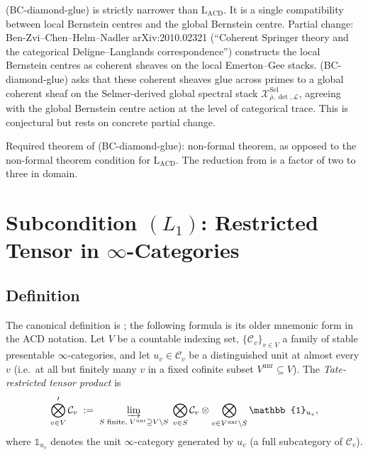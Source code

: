 \begin{remark}
\label{v4-arith:acd:rem:bc-diamond-glue-domain}
(BC-diamond-glue) is strictly narrower than \(\mathrm{L}_{\mathrm{ACD}}\).
It is a single compatibility between local Bernstein centres and the
global Bernstein centre. Partial change:
Ben-Zvi--Chen--Helm--Nadler arXiv:2010.02321 (``Coherent Springer
theory and the categorical Deligne--Langlands correspondence'')
constructs the local Bernstein centres as coherent sheaves on the
local Emerton--Gee stacks. (BC-diamond-glue) asks that these coherent
sheaves glue across primes to a global coherent sheaf on the
Selmer-derived global spectral stack
\(\mathcal{X}^{\mathrm{Sel}}_{\bar\rho,\det,\mathcal{L}}\), agreeing
with the global Bernstein centre action at the level of categorical
trace.
This is conjectural but rests on concrete partial change.

Required theorem of (BC-diamond-glue): non-formal theorem, as opposed
to the non-formal theorem condition for \(\mathrm{L}_{\mathrm{ACD}}\).
The reduction from
 is a factor of two to three
in domain.
\end{remark}

\section{Subcondition \((L_{1})\): Restricted Tensor in \(\infty\)-Categories}
\label{v4-arith:acd:L1}

\subsection{Definition}

\begin{definition}
\label{v4-arith:acd:def:restricted-tensor}
The canonical definition is ;
the following formula is its older mnemonic form in the ACD notation.
Let \(V\) be a countable indexing set, \(\{\mathcal{C}_{v}\}_{v\in V}\)
a family of stable presentable \(\infty\)-categories, and let
\(u_{v}\in\mathcal{C}_{v}\) be a distinguished unit at almost every
\(v\) (i.e.\ at all but finitely many \(v\) in a fixed cofinite subset
\(V^{\mathrm{unr}}\subseteq V\)). The \emph{Tate-restricted tensor
product} is
\begin{equation}
\bigotimes_{v\in V}^{\prime}\mathcal{C}_{v}\;:=\;\varinjlim_{S\text{ finite},\; V^{\mathrm{unr}}\supseteq V\setminus S}\;\bigotimes_{v\in S}\mathcal{C}_{v}\otimes\bigotimes_{v\in V^{\mathrm{unr}}\setminus S}\mathbb{1}_{u_{v}},
\end{equation}
where \(\mathbb{1}_{u_{v}}\) denotes the unit \(\infty\)-category
generated by \(u_{v}\) (a full subcategory of \(\mathcal{C}_{v}\)).
\end{definition}

